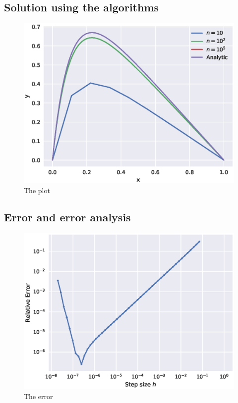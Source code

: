 \documentclass[aps,prl,reprint,toc]{revtex4-1}
\begin{document}
\subsection{Solution using the algorithms}

\begin{figure}[ht]
  \centering
  \includegraphics[width=\columnwidth]{figures/function.eps}
  \caption{\label{fig:general} The plot}
\end{figure}

\subsection{Error and error analysis}

\begin{figure}[ht]
  \centering
  \includegraphics[width=\columnwidth]{figures/error.eps}
  \caption{\label{fig:error} The error}
\end{figure}
\end{document}
